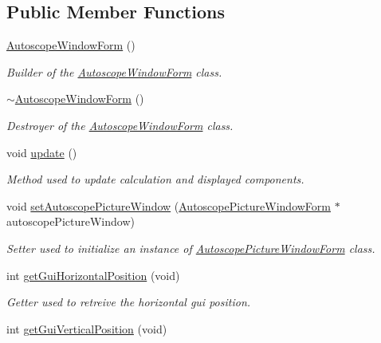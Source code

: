 \subsection*{Public Member Functions}
\begin{DoxyCompactItemize}
\item 
\mbox{\hyperlink{class_autoscope_window_form_abff392139c212a6f9e183d3984a02a47}{Autoscope\+Window\+Form}} ()
\begin{DoxyCompactList}\small\item\em Builder of the \mbox{\hyperlink{class_autoscope_window_form}{Autoscope\+Window\+Form}} class. \end{DoxyCompactList}\item 
\mbox{\hyperlink{class_autoscope_window_form_a2a7cceef655815a6c6ee1cc65a40fa8d}{$\sim$\+Autoscope\+Window\+Form}} ()
\begin{DoxyCompactList}\small\item\em Destroyer of the \mbox{\hyperlink{class_autoscope_window_form}{Autoscope\+Window\+Form}} class. \end{DoxyCompactList}\item 
void \mbox{\hyperlink{class_autoscope_window_form_a732f751b8de766e03f5f79a7a08db136}{update}} ()
\begin{DoxyCompactList}\small\item\em Method used to update calculation and displayed components. \end{DoxyCompactList}\item 
void \mbox{\hyperlink{class_autoscope_window_form_a4308f566557feaba98e031e28e527812}{set\+Autoscope\+Picture\+Window}} (\mbox{\hyperlink{class_autoscope_picture_window_form}{Autoscope\+Picture\+Window\+Form}} $\ast$autoscope\+Picture\+Window)
\begin{DoxyCompactList}\small\item\em Setter used to initialize an instance of \mbox{\hyperlink{class_autoscope_picture_window_form}{Autoscope\+Picture\+Window\+Form}} class. \end{DoxyCompactList}\item 
int \mbox{\hyperlink{class_autoscope_window_form_ad065e4a2a518d779407238e3c258f6e6}{get\+Gui\+Horizontal\+Position}} (void)
\begin{DoxyCompactList}\small\item\em Getter used to retreive the horizontal gui position. \end{DoxyCompactList}\item 
int \mbox{\hyperlink{class_autoscope_window_form_a0d92cd0c7342749009e12058517ba060}{get\+Gui\+Vertical\+Position}} (void)

\end{DoxyCompactItemize}
